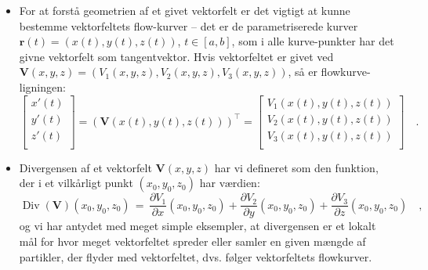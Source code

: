 \begin{summary}
\begin{itemize}
\begin{equation}
\begin{array}{c}
                                                          b_{2} \\
                                                          b_{3} \\
                                                        \end{array}
                                                      \right] \quad .
\end{equation}
\item For at forstå geometrien af et givet vektorfelt er det vigtigt at kunne bestemme vektorfeltets flow-kurver -- det er de parametriserede kurver $\mathbf{r}(t) = (x(t), y(t), z(t))$, $t\in [a,b]$, som i alle kurve-punkter har det givne vektorfelt som tangentvektor. Hvis vektorfeltet er givet ved $\mathbf{V}(x,y,z) = (V_{1}(x,y,z), V_{2}(x,y,z), V_{3}(x,y,z))$, så er flowkurve-ligningen:
\begin{equation}
\left[
  \begin{array}{c}
    x'(t) \\
    y'(t) \\
    z'(t) \\
  \end{array}
\right] = \left(\mathbf{V}(x(t), y(t), z(t))\right)^{\top} = \left[
                                                  \begin{array}{c}
                                                    V_{1}(x(t), y(t), z(t)) \\
                                                     V_{2}(x(t), y(t), z(t)) \\
                                                     V_{3}(x(t), y(t), z(t)) \\
                                                  \end{array}
                                                \right] \quad .
\end{equation}
\item Divergensen af et vektorfelt $\mathbf{V}(x,y,z)$ har vi defineret som den funktion, der i et vilkårligt punkt $(x_{0}, y_{0}, z_{0})$ har værdien:
\begin{equation}
\operatorname{Div}({\mathbf{V}})(x_{0},y_{0},z_{0}) \, = \,
\frac{\partial V_{1}}{\partial
x}(x_{0},y_{0},z_{0}) + \frac{\partial
V_{2}}{\partial y}(x_{0},y_{0},z_{0}) +
\frac{\partial V_{3}}{\partial
z}(x_{0},y_{0},z_{0}) \quad ,
\end{equation}
og vi har antydet med meget simple eksempler, at divergensen er et lokalt  mål for hvor meget vektorfeltet spreder eller samler  en given mængde af partikler, der flyder med vektorfeltet, dvs. følger vektorfeltets flowkurver.

\end{itemize}
\end{summary}
